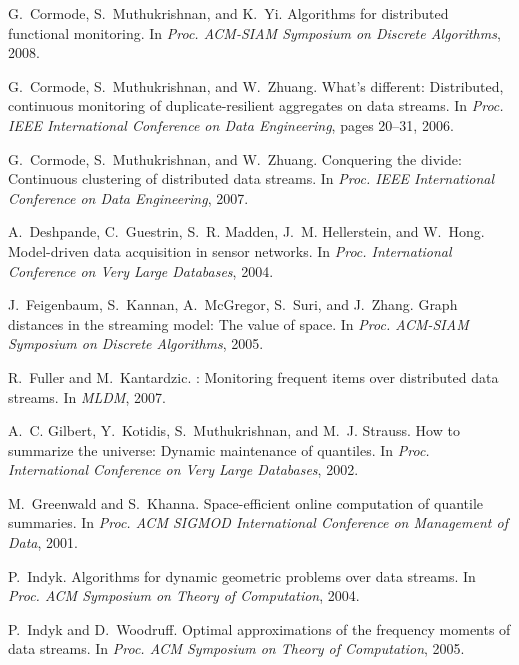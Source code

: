\documentclass[10pt]{article}
\begin{document}
\begin{thebibliography}{10}
G.~Cormode, S.~Muthukrishnan, and K.~Yi.
\newblock Algorithms for distributed functional monitoring.
\newblock In {\em Proc. ACM-SIAM Symposium on Discrete Algorithms}, 2008.

G.~Cormode, S.~Muthukrishnan, and W.~Zhuang.
\newblock What's different: Distributed, continuous monitoring of
  duplicate-resilient aggregates on data streams.
\newblock In {\em Proc. IEEE International Conference on Data Engineering},
  pages 20--31, 2006.

G.~Cormode, S.~Muthukrishnan, and W.~Zhuang.
\newblock Conquering the divide: Continuous clustering of distributed data
  streams.
\newblock In {\em Proc. IEEE International Conference on Data Engineering},
  2007.

A.~Deshpande, C.~Guestrin, S.~R. Madden, J.~M. Hellerstein, and
W.~Hong.
\newblock Model-driven data acquisition in sensor networks.
\newblock In {\em Proc. International Conference on Very Large Databases},
  2004.

J.~Feigenbaum, S.~Kannan, A.~McGregor, S.~Suri, and J.~Zhang.
\newblock Graph distances in the streaming model: The value of space.
\newblock In {\em Proc. ACM-SIAM Symposium on Discrete Algorithms}, 2005.

R.~Fuller and M.~Kantardzic.
: Monitoring frequent items over distributed data streams.
\newblock In {\em MLDM}, 2007.

A.~C. Gilbert, Y.~Kotidis, S.~Muthukrishnan, and M.~J. Strauss.
\newblock How to summarize the universe: Dynamic maintenance of quantiles.
\newblock In {\em Proc. International Conference on Very Large Databases},
  2002.

M.~Greenwald and S.~Khanna.
\newblock Space-efficient online computation of quantile summaries.
\newblock In {\em Proc. ACM SIGMOD International Conference on Management of
  Data}, 2001.

P.~Indyk.
\newblock Algorithms for dynamic geometric problems over data streams.
\newblock In {\em Proc. ACM Symposium on Theory of Computation}, 2004.

P.~Indyk and D.~Woodruff.
\newblock Optimal approximations of the frequency moments of data streams.
\newblock In {\em Proc. ACM Symposium on Theory of Computation}, 2005.


\end{thebibliography}
\end{document}
